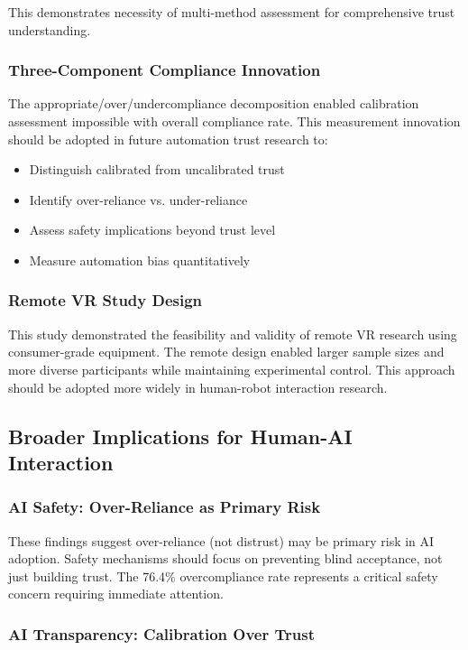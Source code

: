 \documentclass[12pt]{article}
\begin{document}
This demonstrates necessity of multi-method assessment for comprehensive trust understanding.

\subsubsection{Three-Component Compliance Innovation}

The appropriate/over/undercompliance decomposition enabled calibration assessment impossible with overall compliance rate. This measurement innovation should be adopted in future automation trust research to:
\begin{itemize}
    \item Distinguish calibrated from uncalibrated trust
    \item Identify over-reliance vs. under-reliance
    \item Assess safety implications beyond trust level
    \item Measure automation bias quantitatively
\end{itemize}

\subsubsection{Remote VR Study Design}

This study demonstrated the feasibility and validity of remote VR research using consumer-grade equipment. The remote design enabled larger sample sizes and more diverse participants while maintaining experimental control. This approach should be adopted more widely in human-robot interaction research.

\subsection{Broader Implications for Human-AI Interaction}

\subsubsection{AI Safety: Over-Reliance as Primary Risk}

These findings suggest over-reliance (not distrust) may be primary risk in AI adoption. Safety mechanisms should focus on preventing blind acceptance, not just building trust. The 76.4\% overcompliance rate represents a critical safety concern requiring immediate attention.

\subsubsection{AI Transparency: Calibration Over Trust}
\end{document}
